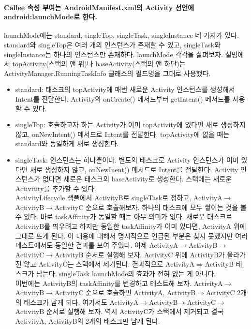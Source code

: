 \paragraph{Callee 속성 부여는 AndroidManifest.xml의 Activity 선언에 android:launchMode로 한다.}
launchMode에는 standard, singleTop, singleTask, singleInstance 네 가지가 있다. standard와 singleTop은 여러 개의 인스턴스가 존재할 수 있고, singleTask와 singleInstance는 하나의 인스턴스만 존재하다. launchMode 각각을 살펴보자. 설명에서 topActivity(스택의 맨 위)나 baseActivity(스택의 맨 하단)는  ActivityManager.RunningTaskInfo 클래스의 필드명을 그대로 사용했다.
\begin{itemize}
\item standard: 태스크의 topActivity에 매번 새로운 Activity 인스턴스를 생성해서 Intent를 전달한다. Activity의 onCreate() 메서드부터 getIntent() 메서드를 사용할 수 있다.
\item singleTop: 호출하고자 하는 Activity가 이미 topActivity에 있다면 새로 생성하지 않고, onNewIntent() 메서드로 Intent를 전달한다. topActivity에 없을 때는 standard와 동일하게 새로 생성한다.
\item singleTask: 인스턴스는 하나뿐이다. 별도의 태스크로 Activity 인스턴스가 이미 있다면 새로 생성하지 않고, onNewInent() 메서드로 Intent를 전달한다. 
Activity 인스턴스가 없다면 새로운 태스크의 baseActivity로 생성한다. 스택에는 새로운 Activitity를 추가할 수 있다.\\

ActivityLifecycle 샘플에서 ActivityB로 singleTask로 정하고, ActivityA$\rightarrow$ActivityB$\rightarrow$ActivityC 순으로 호출해보자. 하나의 태스크에 모두 쌓이는 것을 볼 수 있다. 바로 taskAffinity가 동일할 때는 아무 의미가 없다. 새로운 태스크로 ActivityB를 띄우려고 하지만 동일한 taskAffinity가 이미 있다면,  ActivityA 위에 그대로 뜨게 된다. 이 내용에 대해서 명시적으로 언급된 부분은 찾지 못했지만 여러 테스트에서도 동일한 결과를 보여 주었다. 이제 ActivityA$\rightarrow$ActivityB$\rightarrow$ActivityC$\rightarrow$ActivityB 순서로 실행해 보자. ActivityC 위에 ActivityB가 올라가진 않고 ActivityC는 스택에서 제거된다. 결과적으로 ActivityA$\Rightarrow$ActivityB 태스크가 남는다. singleTask launchMode의 효과가 전혀 없는 게 아니다.\\

이번에는 ActivityB의 taskAffinity를 변경하고 테스트해 보자. ActivityA$\rightarrow$ActivityB$\rightarrow$ActivityC 순으로 호출하면 ActivityA, ActivityB$\Rightarrow$ActivityC 2개의 태스크가 남게 되다. 
여기서도 ActivityA$\rightarrow$ActivityB$\rightarrow\newline$ActivityC$\rightarrow$ActivityB 순서로 실행해 보자. 역시 ActivityC가 스택에서 제거되고 결국 ActivityA, ActivityB의 2개의 태스크만 남게 된다.\\


\end{itemize}
